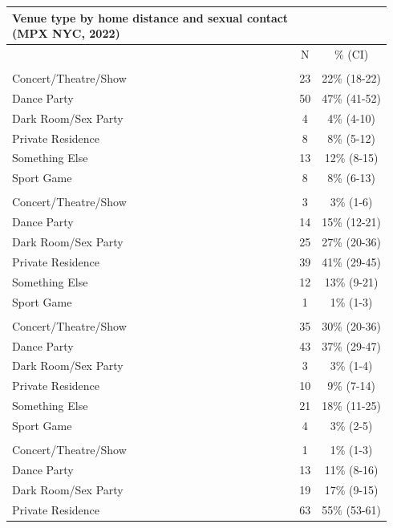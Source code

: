 \documentclass[
  letterpaper,
  DIV=11,
  numbers=noendperiod,
  oneside]{scrreprt}
\begin{document}
\begin{longtable*}{lcc}
\caption*{
{\large Venue type by home distance and sexual contact} \\ 
{\small (MPX NYC, 2022)}
} \\ 
\toprule
 & N & \% (CI) \\ 
\midrule\addlinespace[2.5pt]
 \\ 
\midrule\addlinespace[2.5pt]
Concert/Theatre/Show & 23 & 22\% (18-22) \\ 
Dance Party & 50 & 47\% (41-52) \\ 
Dark Room/Sex Party & 4 & 4\% (4-10) \\ 
Private Residence & 8 & 8\% (5-12) \\ 
Something Else & 13 & 12\% (8-15) \\ 
Sport Game & 8 & 8\% (6-13) \\ 
\midrule\addlinespace[2.5pt]
 \\ 
\midrule\addlinespace[2.5pt]
Concert/Theatre/Show & 3 & 3\% (1-6) \\ 
Dance Party & 14 & 15\% (12-21) \\ 
Dark Room/Sex Party & 25 & 27\% (20-36) \\ 
Private Residence & 39 & 41\% (29-45) \\ 
Something Else & 12 & 13\% (9-21) \\ 
Sport Game & 1 & 1\% (1-3) \\ 
\midrule\addlinespace[2.5pt]
 \\ 
\midrule\addlinespace[2.5pt]
Concert/Theatre/Show & 35 & 30\% (20-36) \\ 
Dance Party & 43 & 37\% (29-47) \\ 
Dark Room/Sex Party & 3 & 3\% (1-4) \\ 
Private Residence & 10 & 9\% (7-14) \\ 
Something Else & 21 & 18\% (11-25) \\ 
Sport Game & 4 & 3\% (2-5) \\ 
\midrule\addlinespace[2.5pt]
 \\ 
\midrule\addlinespace[2.5pt]
Concert/Theatre/Show & 1 & 1\% (1-3) \\ 
Dance Party & 13 & 11\% (8-16) \\ 
Dark Room/Sex Party & 19 & 17\% (9-15) \\ 
Private Residence & 63 & 55\% (53-61) \\ 

\end{longtable*}
\end{document}
